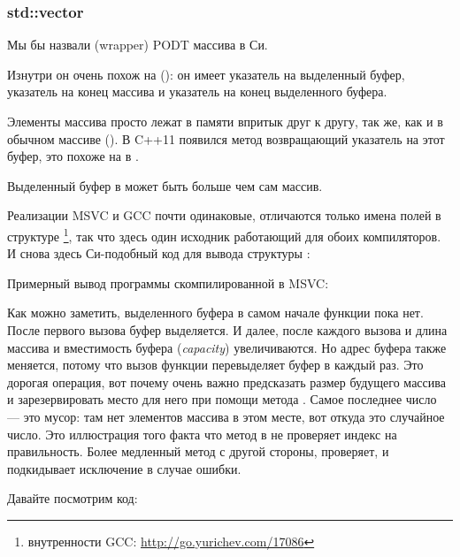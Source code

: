 \subsubsection{std::vector}

Мы бы назвали   (wrapper) \ac{PODT} массива в Си.

Изнутри он очень похож на  ():
он имеет указатель на выделенный буфер, указатель на конец массива и указатель на конец выделенного буфера.

Элементы массива просто лежат в памяти впритык друг к другу, так же, как и в обычном массиве ().
В C++11 появился метод  возвращающий указатель на этот буфер, это похоже на  в .

Выделенный буфер в  может быть больше чем сам массив.

Реализации MSVC и GCC почти одинаковые, отличаются только имена полей в структуре
\footnote
{внутренности GCC: \url{http://go.yurichev.com/17086}}, так что здесь один исходник работающий для обоих компиляторов.
И снова здесь Си-подобный код для вывода структуры :



Примерный вывод программы скомпилированной в MSVC:



Как можно заметить, выделенного буфера в самом начале функции \main пока нет.
После первого вызова  буфер выделяется.
И далее, после каждого вызова  
и длина массива и вместимость буфера (\emph{capacity}) увеличиваются.
Но адрес буфера также меняется, потому что вызов функции  перевыделяет буфер в 
каждый раз.
Это дорогая операция, вот почему очень важно предсказать размер будущего массива и зарезервировать место для него
при помощи метода .
Самое последнее число --- это мусор: там нет элементов массива в этом месте, вот откуда это случайное число.
Это иллюстрация того факта что метод  в  не проверяет индекс на правильность.
Более медленный метод  с другой стороны, проверяет, и подкидывает исключение  
в случае ошибки.

Давайте посмотрим код:

